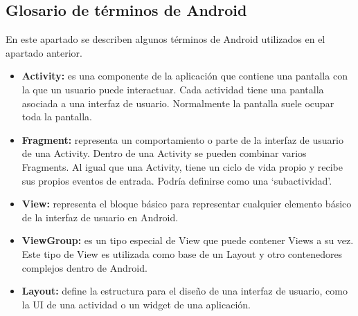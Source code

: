 \subsection{Glosario de términos de Android}
\label{sec:glosario}
En este apartado se describen algunos términos de Android utilizados en el apartado anterior.
\begin{itemize}
	\item \textbf{Activity:} es una componente de la aplicación que contiene una pantalla con la que un usuario puede interactuar. Cada actividad tiene una pantalla asociada a una interfaz de usuario. Normalmente la pantalla suele ocupar toda la pantalla.
	\item \textbf{Fragment:} representa un comportamiento o parte de la interfaz de usuario de una Activity. Dentro de una Activity se pueden combinar varios Fragments. Al igual que una Activity, tiene un ciclo de vida propio y recibe sus propios eventos de entrada. Podría definirse como una \enquote*{subactividad}.
	\item \textbf{View:} representa el bloque básico para representar cualquier elemento básico de la interfaz de usuario en Android.
	\item \textbf{ViewGroup:} es un tipo especial de View que puede contener Views a su vez. Este tipo de View es utilizada como base de un Layout y otro contenedores complejos dentro de Android.
	\item \textbf{Layout:} define la estructura para el diseño de una interfaz de usuario, como la UI de una actividad o un widget de una aplicación.
\end{itemize}

